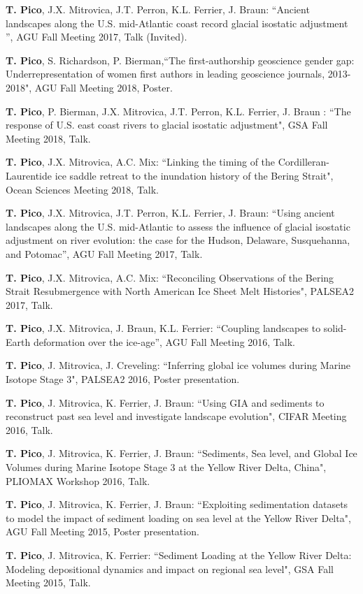 \documentclass[margin,line]{res}
\begin{document}
\begin{resume}
{\bf T. Pico}, J.X. Mitrovica, J.T. Perron, K.L. Ferrier, J. Braun: ``Ancient landscapes along the U.S. mid-Atlantic coast record glacial isostatic adjustment '', AGU Fall Meeting 2017, Talk (Invited).

{\bf T. Pico}, S. Richardson, P. Bierman,``The first-authorship geoscience gender gap: Underrepresentation of women first authors in leading geoscience journals, 2013-2018", AGU Fall Meeting 2018, Poster.

{\bf T. Pico}, P. Bierman, J.X. Mitrovica, J.T. Perron, K.L. Ferrier, J. Braun : ``The response of U.S. east coast rivers to glacial isostatic adjustment", GSA Fall Meeting 2018, Talk.

{\bf T. Pico}, J.X. Mitrovica, A.C. Mix: ``Linking the timing of the Cordilleran-Laurentide ice saddle retreat to the inundation history of the Bering Strait", Ocean Sciences Meeting 2018, Talk.

{\bf T. Pico}, J.X. Mitrovica, J.T. Perron, K.L. Ferrier, J. Braun: ``Using ancient landscapes along the U.S. mid-Atlantic to assess the influence of glacial isostatic adjustment on river evolution: the case for the Hudson, Delaware, Susquehanna, and Potomac'', AGU Fall Meeting 2017, Talk.

{\bf T. Pico}, J.X. Mitrovica, A.C. Mix: ``Reconciling Observations of the Bering Strait Resubmergence with North American Ice Sheet Melt Histories", PALSEA2 2017, Talk.

{\bf T. Pico}, J.X. Mitrovica, J. Braun, K.L. Ferrier: ``Coupling landscapes to solid-Earth deformation over the ice-age'', AGU Fall Meeting 2016, Talk. 

{\bf T. Pico}, J. Mitrovica, J. Creveling: ``Inferring global ice volumes during Marine Isotope Stage 3", PALSEA2 2016, Poster presentation.

{\bf T. Pico}, J. Mitrovica, K. Ferrier, J. Braun: ``Using GIA and sediments to reconstruct past sea level and investigate landscape evolution", CIFAR Meeting 2016, Talk.

{\bf T. Pico}, J. Mitrovica, K. Ferrier, J. Braun: ``Sediments, Sea level, and Global Ice Volumes during Marine Isotope Stage 3 at the Yellow River Delta, China", PLIOMAX Workshop 2016, Talk.

{\bf T. Pico}, J. Mitrovica, K. Ferrier, J. Braun: ``Exploiting sedimentation datasets to model the impact of sediment loading on sea level at the Yellow River Delta", AGU Fall Meeting 2015, Poster presentation.

{\bf T. Pico}, J. Mitrovica, K. Ferrier: ``Sediment Loading at the Yellow River Delta: Modeling depositional dynamics and impact on regional sea level", GSA Fall Meeting 2015, Talk.  


\end{resume}
\end{document}
